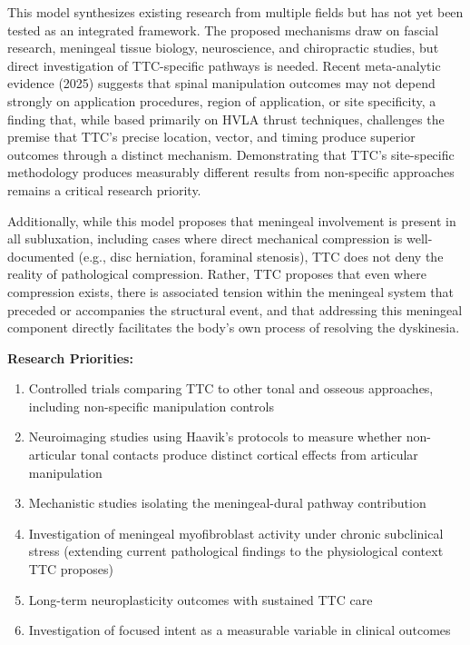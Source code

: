 \documentclass[11pt,letterpaper]{article}
\begin{document}
This model synthesizes existing research from multiple fields but has not yet been tested as an integrated framework. The proposed mechanisms draw on fascial research, meningeal tissue biology, neuroscience, and chiropractic studies, but direct investigation of TTC-specific pathways is needed. Recent meta-analytic evidence (2025) suggests that spinal manipulation outcomes may not depend strongly on application procedures, region of application, or site specificity, a finding that, while based primarily on HVLA thrust techniques, challenges the premise that TTC's precise location, vector, and timing produce superior outcomes through a distinct mechanism. Demonstrating that TTC's site-specific methodology produces measurably different results from non-specific approaches remains a critical research priority.


Additionally, while this model proposes that meningeal involvement is present in all subluxation, including cases where direct mechanical compression is well-documented (e.g., disc herniation, foraminal stenosis), TTC does not deny the reality of pathological compression. Rather, TTC proposes that even where compression exists, there is associated tension within the meningeal system that preceded or accompanies the structural event, and that addressing this meningeal component directly facilitates the body's own process of resolving the dyskinesia.


\textbf{Research Priorities:}

\begin{enumerate}
\item Controlled trials comparing TTC to other tonal and osseous approaches, including non-specific manipulation controls
\item Neuroimaging studies using Haavik's protocols to measure whether non-articular tonal contacts produce distinct cortical effects from articular manipulation
\item Mechanistic studies isolating the meningeal-dural pathway contribution
\item Investigation of meningeal myofibroblast activity under chronic subclinical stress (extending current pathological findings to the physiological context TTC proposes)
\item Long-term neuroplasticity outcomes with sustained TTC care
\item Investigation of focused intent as a measurable variable in clinical outcomes
\end{enumerate}
\end{document}
